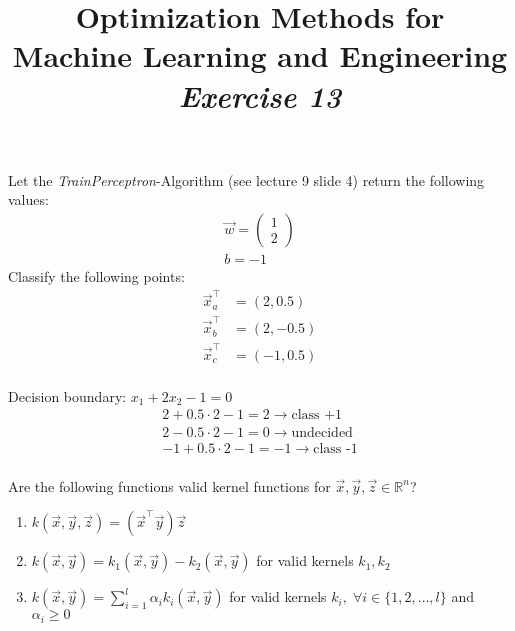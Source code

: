



\author{}
\date{}
\title{Optimization Methods for \\Machine Learning and Engineering\\\vspace{0.5cm}\textit{Exercise 13}}
\maketitle


\setcounter{section}{13}
\setcounter{exercise}{0}


\begin{exercise}[subtitle={Paper}]
Let the \textit{TrainPerceptron}-Algorithm (see lecture 9 slide 4) return the following values:
\begin{align*}
\vec{w} = \begin{pmatrix}
1\\
2
\end{pmatrix}\\
b = -1
\end{align*}
Classify the following points:
\begin{align*}
\vec{x}_a^\top &= (2,0.5)\\
\vec{x}_b^\top &= (2,-0.5)\\
\vec{x}_c^\top &= (-1,0.5)\\
\end{align*}
\end{exercise}

\begin{solution}[print=false]
Decision boundary:
$x_1 + 2x_2 - 1 = 0$
\begin{align*}
2+0.5\cdot 2-1 = 2 \rightarrow \text{class +1}\\
2-0.5\cdot 2-1 = 0 \rightarrow \text{undecided}\\
-1+0.5\cdot 2-1 = -1 \rightarrow \text{class -1}\\
\end{align*}
\end{solution}

\begin{exercise}[subtitle={Paper}]
  Are the following functions valid kernel functions for $\vec x, \vec y, \vec z \in \mathbb{R}^n$?
\begin{enumerate}[label=\emph{\alph*)}]
  \item $k(\vec x,\vec y,\vec z) = (\vec x^\top \vec y) \vec z$
  \item $k(\vec x,\vec y) = k_1(\vec x,\vec y) - k_2(\vec x,\vec y)$ for valid kernels $k_1, k_2$ 
  \item $k(\vec x,\vec y) = \sum_{i=1}^l \alpha_i k_i(\vec x,\vec y)$ for valid kernels $k_i,\; \forall i \in \{1,2,\dots ,l \}$ and $\alpha_i \geq 0$
  \end{enumerate}
\end{exercise}

